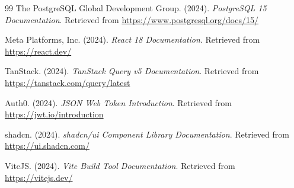 \documentclass[12pt,a4paper]{report}
\begin{document}
\begin{thebibliography}{99}
The PostgreSQL Global Development Group. (2024). \textit{PostgreSQL 15 Documentation}. Retrieved from \url{https://www.postgresql.org/docs/15/}

Meta Platforms, Inc. (2024). \textit{React 18 Documentation}. Retrieved from \url{https://react.dev/}

TanStack. (2024). \textit{TanStack Query v5 Documentation}. Retrieved from \url{https://tanstack.com/query/latest}

Auth0. (2024). \textit{JSON Web Token Introduction}. Retrieved from \url{https://jwt.io/introduction}

shadcn. (2024). \textit{shadcn/ui Component Library Documentation}. Retrieved from \url{https://ui.shadcn.com/}

ViteJS. (2024). \textit{Vite Build Tool Documentation}. Retrieved from \url{https://vitejs.dev/}

\end{thebibliography}
\endgroup

\printindex
\end{document}
